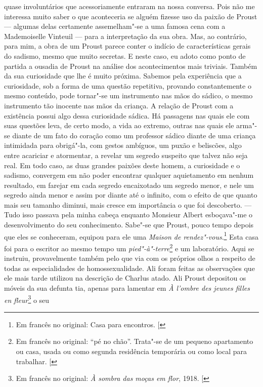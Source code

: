 quase involuntários que acessoriamente entraram na nossa conversa. Pois
não me interessa muito saber o que aconteceria se alguém fizesse uso da
paixão de Proust --- algumas delas certamente assemelham"-se a uma famosa
cena com a Mademoiselle Vinteuil --- para a interpretação da sua obra.
Mas, ao contrário, para mim, a obra de um Proust parece conter o indício
de características gerais do sadismo, mesmo que muito secretas. E neste
caso, eu adoto como ponto de partida a ousadia de Proust na análise dos
acontecimentos mais triviais. Também da sua curiosidade que lhe é muito
próxima. Sabemos pela experiência que a curiosidade, sob a forma de uma
questão repetitiva, provando constantemente o mesmo conteúdo, pode
tornar"-se um instrumento nas mãos do sádico, o mesmo instrumento tão
inocente nas mãos da criança. A relação de Proust com a existência
possui algo dessa curiosidade sádica. Há passagens nas quais ele com
suas questões leva, de certo modo, a vida ao extremo, outras nas quais
ele arma"-se diante de um fato do coração como um professor sádico diante
de uma criança intimidada para obrigá"-la, com gestos ambíguos, um puxão
e beliscões, algo entre acariciar e atormentar, a revelar um segredo
suspeito que talvez não seja real. Em todo caso, as duas grandes paixões
deste homem, a curiosidade e o sadismo, convergem em não poder encontrar
qualquer aquietamento em nenhum resultado, em farejar em cada segredo
encaixotado um segredo menor, e nele um segredo ainda menor e assim por
diante até o infinito, com o efeito de que quanto mais seu tamanho
diminui, mais cresce em importância o que foi descoberto. --- Tudo isso
passava pela minha cabeça enquanto Monsieur Albert esboçava"-me o
desenvolvimento do seu conhecimento. Sabe"-se que Proust, pouco tempo
depois que eles se conheceram, equipou para ele uma \emph{Maison de
rendez"-vous}.\footnote{Em francês no original:  Casa para encontros. {[}\versal{N.~T.}{]}} Esta casa foi para o escritor ao mesmo tempo um
\emph{pied"-à"-terre}\footnote{Em francês no original: ``pé no chão''. Trata"-se de um pequeno apartamento ou casa, usada ou como segunda residência temporária ou como local para trabalhar. {[}\versal{N.~T.}{]}} e um laboratório. Aqui se instruiu,
provavelmente também pelo que via com os próprios olhos a respeito de
todas as especialidades de homossexualidade. Ali foram feitas as
observações que ele mais tarde utilizou na descrição de Charlus
atado. Ali Proust depositou os móveis da sua defunta tia, apenas
para lamentar em \emph{À l'ombre des jeunes filles en fleur}\footnote{Em francês no original: \emph{À sombra das moças em flor}, 1918. {[}\versal{N.~T.}{]}} o seu
